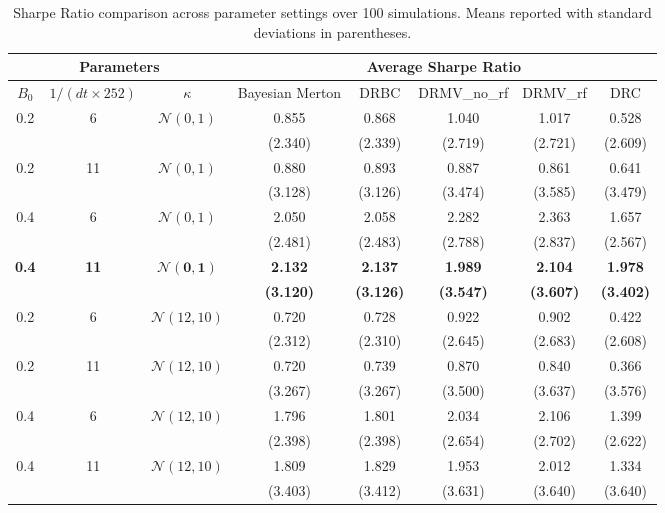 \documentclass[11pt]{article}
\theoremstyle{definition}
\begin{document}
\begin{table}[H]
\centering
\small
\renewcommand{\arraystretch}{1.25}
\begin{tabular}{cccccccc}
\toprule
\multicolumn{3}{c}{Parameters} & \multicolumn{5}{c}{Average Sharpe Ratio} \\
\midrule
$B_0$ & $1/(dt\times252)$ & $\kappa$ & Bayesian Merton & DRBC & DRMV\_no\_rf & DRMV\_rf & DRC \\
\midrule

0.2 & 6  & $\mathcal{N}(0,1)$ 
& 0.855 & 0.868 & 1.040 & 1.017 & 0.528 \\
&     &        
& (2.340) & (2.339) & (2.719) & (2.721) & (2.609) \\

0.2 & 11 & $\mathcal{N}(0,1)$ 
& 0.880 & 0.893 & 0.887 & 0.861 & 0.641 \\
&     &        
& (3.128) & (3.126) & (3.474) & (3.585) & (3.479) \\

0.4 & 6  & $\mathcal{N}(0,1)$ 
& 2.050 & 2.058 & 2.282 & 2.363 & 1.657 \\
&     &        
& (2.481) & (2.483) & (2.788) & (2.837) & (2.567) \\

\textbf{0.4} & \textbf{11} & $\bm{\mathcal{N}(0,1)}$ 
& \textbf{2.132} & \textbf{2.137} & \textbf{1.989} & \textbf{2.104} & \textbf{1.978} \\
&     &        
& \textbf{(3.120)} & \textbf{(3.126)} & \textbf{(3.547)} & \textbf{(3.607)} & \textbf{(3.402)} \\

0.2 & 6  & $\mathcal{N}(12,10)$ 
& 0.720 & 0.728 & 0.922 & 0.902 & 0.422 \\
&     &        
& (2.312) & (2.310) & (2.645) & (2.683) & (2.608) \\

0.2 & 11 & $\mathcal{N}(12,10)$ 
& 0.720 & 0.739 & 0.870 & 0.840 & 0.366 \\
&     &        
& (3.267) & (3.267) & (3.500) & (3.637) & (3.576) \\

0.4 & 6  & $\mathcal{N}(12,10)$ 
& 1.796 & 1.801 & 2.034 & 2.106 & 1.399 \\
&     &        
& (2.398) & (2.398) & (2.654) & (2.702) & (2.622) \\

0.4 & 11 & $\mathcal{N}(12,10)$ 
& 1.809 & 1.829 & 1.953 & 2.012 & 1.334 \\
&     &        
& (3.403) & (3.412) & (3.631) & (3.640) & (3.640) \\

\bottomrule
\end{tabular}
\caption{Sharpe Ratio comparison across parameter settings over 100 simulations. Means reported with standard deviations in parentheses.}
\label{sharpe_highdim}
\end{table}
\end{document}
